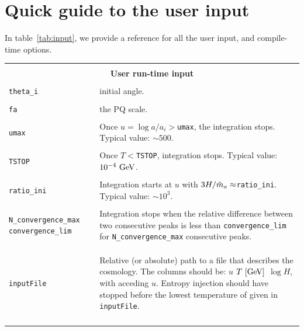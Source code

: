 \documentclass[11pt,a4paper]{article}
\begin{document}
\section{Quick guide to the user input}\label{app:usr_input}
\setcounter{equation}{0}
In table~\ref{tab:input}, we provide a reference for all the user input, and compile-time options.
%
\begin{table}[h!]
	\centering
	\begin{tabular}{l l}
		\hline\\[-0.4cm]
		\multicolumn{2}{c}{\bf User run-time input}  \\
		\hline\\[-0.4cm]

		{\tt theta\_i} & initial angle.  \\
		\hline\\[-0.4cm]

		{\tt fa} & the PQ scale.\\
		\hline\\[-0.4cm]

		{\tt umax } & Once $u=\log a/a_i>${\tt umax}, the integration stops. Typical value: $\sim 500$.\\
		\hline\\[-0.4cm]

		{\tt TSTOP} & Once $T<${\tt TSTOP}, integration stops. Typical value: $10^{-4}~{\rm GeV}$.\\
		\hline\\[-0.4cm]

 		{\tt ratio\_ini}& Integration starts at $u$ with $3H/\tilde m_{a}{} \approx${\tt ratio\_ini}. Typical value: $\sim 10^{3}$.\\
		\hline\\[-0.4cm]

		\multirow{1}{4cm}{{\tt N\_convergence\_max} {\tt convergence\_lim}} & \multirow{1}{12cm}{Integration stops when  the relative difference 
		between two consecutive peaks  is less than {\tt convergence\_lim} for {\tt N\_convergence\_max} 
		consecutive peaks. } \\ \\ \\ 
		\hline\\[-0.4cm]

		{\tt inputFile} & \multirow{1}{12cm}{Relative (or absolute) path to a file that describes the cosmology. The columns should be: $u$ $T ~[{\rm GeV}]$ $\log H$, with acceding $u$. Entropy injection should have stopped before the lowest temperature of given in {\tt inputFile}.} \\ \\  \\ \\
		\hline\\[-0.4cm]


\end{tabular}
\end{table}
\end{document}
